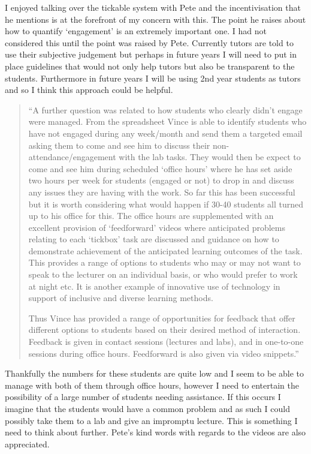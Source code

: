 \documentclass{article}
\begin{document}
I enjoyed talking over the tickable system with Pete and the incentivisation that he mentions is at the forefront of my concern with this. The point he raises about how to quantify `engagement' is an extremely important one. I had not considered this until the point was raised by Pete. Currently tutors are told to use their subjective judgement but perhaps in future years I will need to put in place guidelines that would not only help tutors but also be transparent to the students. Furthermore in future years I will be using 2nd year students as tutors and so I think this approach could be helpful.

\begin{quote}
``A further question was related to how students who clearly didn't engage were managed. From the spreadsheet Vince is able to identify students who have not engaged during any week/month and send them a targeted email asking them to come and see him to discuss their non-attendance/engagement with the lab tasks. They would then be expect to come and see him during scheduled `office hours' where he has set aside two hours per week for students (engaged or not) to drop in and discuss any issues they are having with the work. So far this has been successful but it is worth considering what would happen if 30-40 students all turned up to his office for this. The office hours are supplemented with an excellent provision of `feedforward' videos where anticipated problems relating to each `tickbox' task are discussed and guidance on how to demonstrate achievement of the anticipated learning outcomes of the task. This provides a range of options to students who may or may not want to speak to the lecturer on an individual basis, or who would prefer to work at night etc. It is another example of innovative use of technology in support of inclusive and diverse learning methods.

Thus Vince has provided a range of opportunities for feedback that offer different options to students based on their desired method of interaction. Feedback is given in contact sessions (lectures and labs), and in one-to-one sessions during office hours. Feedforward is also given via video snippets.''
\end{quote}

Thankfully the numbers for these students are quite low and I seem to be able to manage with both of them through office hours, however I need to entertain the possibility of a large number of students needing assistance. If this occurs I imagine that the students would have a common problem and as such I could possibly take them to a lab and give an impromptu lecture. This is something I need to think about further. Pete's kind words with regards to the videos are also appreciated.
\end{document}
